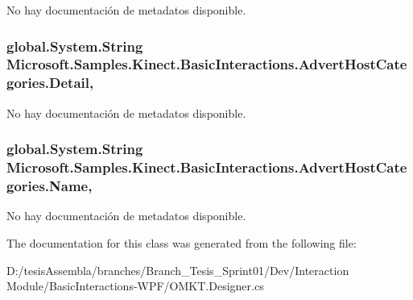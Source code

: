 No hay documentación de metadatos disponible. 

\hypertarget{class_microsoft_1_1_samples_1_1_kinect_1_1_basic_interactions_1_1_advert_host_categories_a143577cd2c0a8d32db7d0ad18fe49495}{
\subsubsection[{Detail}]{\setlength{\rightskip}{0pt plus 5cm}global.\-System.\-String Microsoft.\-Samples.\-Kinect.\-Basic\-Interactions.\-Advert\-Host\-Categories.\-Detail\hspace{0.3cm}{\ttfamily [get]}, {\ttfamily [set]}}}\label{class_microsoft_1_1_samples_1_1_kinect_1_1_basic_interactions_1_1_advert_host_categories_a143577cd2c0a8d32db7d0ad18fe49495}


No hay documentación de metadatos disponible. 

\hypertarget{class_microsoft_1_1_samples_1_1_kinect_1_1_basic_interactions_1_1_advert_host_categories_ab9bd997ece4f19e8119a1088cfe96a37}{
\subsubsection[{Name}]{\setlength{\rightskip}{0pt plus 5cm}global.\-System.\-String Microsoft.\-Samples.\-Kinect.\-Basic\-Interactions.\-Advert\-Host\-Categories.\-Name\hspace{0.3cm}{\ttfamily [get]}, {\ttfamily [set]}}}\label{class_microsoft_1_1_samples_1_1_kinect_1_1_basic_interactions_1_1_advert_host_categories_ab9bd997ece4f19e8119a1088cfe96a37}


No hay documentación de metadatos disponible. 



The documentation for this class was generated from the following file\-:\begin{DoxyCompactItemize}
\item 
D\-:/tesis\-Assembla/branches/\-Branch\-\_\-\-Tesis\-\_\-\-Sprint01/\-Dev/\-Interaction Module/\-Basic\-Interactions-\/\-W\-P\-F/O\-M\-K\-T.\-Designer.\-cs\end{DoxyCompactItemize}
